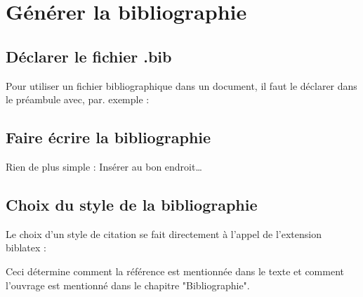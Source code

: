 \section{Générer la bibliographie}



\subsection{Déclarer le fichier .bib}

Pour utiliser un fichier bibliographique  dans un document, il faut le déclarer dans le préambule avec, par. exemple :
\begin{center}
	\inlatex{}
\end{center}



\subsection{Faire écrire la bibliographie}

Rien de plus simple : Insérer \inlatex{\printbibliography} au bon endroit\dots




\subsection{Choix du style de la bibliographie}

Le choix d'un style de citation se fait directement à l'appel de l'extension biblatex :
\begin{center}
	\inlatex{\usepackage[style=numeric]{biblatex}}
\end{center}
Ceci détermine comment la référence est mentionnée dans le texte et comment l'ouvrage est mentionné dans le chapitre "Bibliographie".

